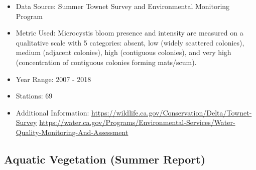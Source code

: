 \documentclass[
]{book}
\providecommand{\tightlist}{%
  \setlength{\itemsep}{0pt}\setlength{\parskip}{0pt}}
\begin{document}
\begin{itemize}
\tightlist
\item
  Data Source: Summer Townet Survey and Environmental Monitoring Program
\item
  Metric Used: Microcystis bloom presence and intensity are measured on a qualitative scale with 5 categories: absent, low (widely scattered colonies), medium (adjacent colonies), high (contiguous colonies), and very high (concentration of contiguous colonies forming mats/scum).
\item
  Year Range: 2007 - 2018
\item
  Stations: 69
\item
  Additional Information: \url{https://wildlife.ca.gov/Conservation/Delta/Townet-Survey} \url{https://water.ca.gov/Programs/Environmental-Services/Water-Quality-Monitoring-And-Assessment}
\end{itemize}

\hypertarget{aquatic-vegetation-summer-report}{%
\subsection{Aquatic Vegetation (Summer Report)}\label{aquatic-vegetation-summer-report}}
\end{document}
